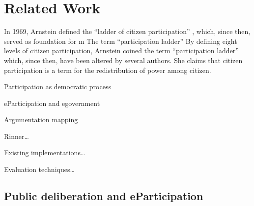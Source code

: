 \section{Related Work}
\label{chap:related_work}
In 1969, Arnstein defined the ``ladder of citizen participation'' \cite{Arnstein1969_citizen_participation}, which, since then, served as foundation for m
The term ``participation ladder''
By defining eight levels of citizen participation, Arnstein \cite{Arnstein1969_citizen_participation} coined the term ``participation ladder'' which, since then, have been altered \cite{Cai2009_spatial_annotation_deliberation,Connor1988_new_ladder} by several authors. She claims that citizen participation is a term for the redistribution of power among citizen.

Participation as democratic process

eParticipation and egovernment

Argumentation mapping

Rinner\cite{Rinner_ArgumentationMaps}\dots

Existing implementations\dots

Evaluation techniques\dots


\subsection{Public deliberation and eParticipation}

